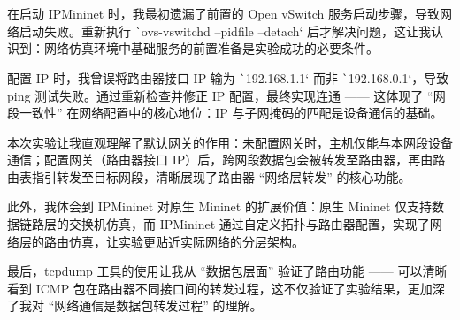 \documentclass[12pt, a4paper]{ctexart}
\begin{document}
在启动 IPMininet 时，我最初遗漏了前置的 Open vSwitch 服务启动步骤，导致网络启动失败。重新执行 \texttt`ovs-vswitchd --pidfile --detach` 后才解决问题，这让我认识到：网络仿真环境中基础服务的前置准备是实验成功的必要条件。

配置 IP 时，我曾误将路由器接口 IP 输为 \texttt`192.168.1.1` 而非 \texttt`192.168.0.1`，导致 ping 测试失败。通过重新检查并修正 IP 配置，最终实现连通 —— 这体现了 ``网段一致性'' 在网络配置中的核心地位：IP 与子网掩码的匹配是设备通信的基础。

本次实验让我直观理解了默认网关的作用：未配置网关时，主机仅能与本网段设备通信；配置网关（路由器接口 IP）后，跨网段数据包会被转发至路由器，再由路由表指引转发至目标网段，清晰展现了路由器 ``网络层转发'' 的核心功能。

此外，我体会到 IPMininet 对原生 Mininet 的扩展价值：原生 Mininet 仅支持数据链路层的交换机仿真，而 IPMininet 通过自定义拓扑与路由器配置，实现了网络层的路由仿真，让实验更贴近实际网络的分层架构。

最后，tcpdump 工具的使用让我从 ``数据包层面'' 验证了路由功能 —— 可以清晰看到 ICMP 包在路由器不同接口间的转发过程，这不仅验证了实验结果，更加深了我对 ``网络通信是数据包转发过程'' 的理解。
\end{document}
